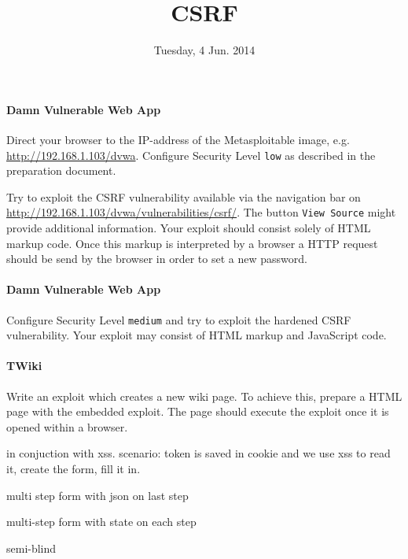 \documentclass{./handout}
\title{CSRF}
\date{Tuesday, 4 Jun. 2014} %
\begin{document}
\maketitle


\begin{subtask}
\paragraph{Damn Vulnerable Web App}
Direct your browser to the IP-address of the Metasploitable image,
e.g. \href{http://192.168.1.103/dvwa}{http://192.168.1.103/dvwa}. 
Configure Security Level \texttt{low} as described in the preparation 
document.

Try to exploit the CSRF vulnerability available via the navigation bar
on \href{http://192.168.1.103/dvwa/vulnerabilities/csrf/}
	{http://192.168.1.103/dvwa/vulnerabilities/csrf/}.
The button \texttt{View Source} might provide additional information.
Your exploit should consist solely of HTML markup code. Once this markup
is interpreted by a browser a HTTP request should be send by the browser
in order to set a new password.
\end{subtask}

\begin{subtask}
\paragraph{Damn Vulnerable Web App}
Configure Security Level \texttt{medium} and try to exploit the hardened 
CSRF vulnerability.
Your exploit may consist of HTML markup and JavaScript code.
\end{subtask}

\begin{subtask}
\paragraph{TWiki}
Write an exploit which creates a new wiki page. To achieve this, prepare 
a HTML page with the embedded exploit. The page should execute the exploit
once it is opened within a browser.
\end{subtask}


\begin{subtask}
in conjuction with xss. scenario: token is saved in cookie and we use xss
to read it, create the form, fill it in.
\end{subtask}

\begin{subtask}
multi step form with json on last step
\end{subtask}

\begin{subtask}

multi-step form with state on each step

semi-blind
\end{subtask}
\end{document}

